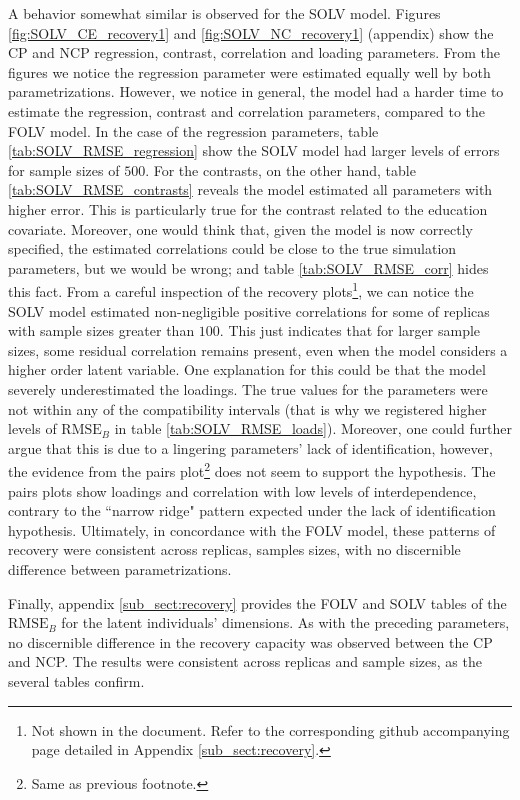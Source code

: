 A behavior somewhat similar is observed for the SOLV model. Figures \ref{fig:SOLV_CE_recovery1} and \ref{fig:SOLV_NC_recovery1} (appendix) show the CP and NCP regression, contrast, correlation and loading parameters. From the figures we notice the regression parameter were estimated equally well by both parametrizations. However, we notice in general, the model had a harder time to estimate the regression, contrast and correlation parameters, compared to the FOLV model. In the case of the regression parameters, table \ref{tab:SOLV_RMSE_regression} show the SOLV model had larger levels of errors for sample sizes of $500$. For the contrasts, on the other hand, table \ref{tab:SOLV_RMSE_contrasts} reveals the model estimated all parameters with higher error. This is particularly true for the contrast related to the education covariate. Moreover, one would think that, given the model is now correctly specified, the estimated correlations could be close to the true simulation parameters, but we would be wrong; and table \ref{tab:SOLV_RMSE_corr} hides this fact. From a careful inspection of the recovery plots\footnote{Not shown in the document. Refer to the corresponding github accompanying page detailed in Appendix \ref{sub_sect:recovery}.}, we can notice the SOLV model estimated non-negligible positive correlations for some of replicas with sample sizes greater than $100$. This just indicates that for larger sample sizes, some residual correlation remains present, even when the model considers a higher order latent variable. One explanation for this could be that the model severely underestimated the loadings. The true values for the parameters were not within any of the compatibility intervals (that is why we registered higher levels of $\text{RMSE}_{B}$ in table \ref{tab:SOLV_RMSE_loads}). Moreover, one could further argue that this is due to a lingering parameters' lack of identification, however, the evidence from the pairs plot\footnote{Same as previous footnote.} does not seem to support the hypothesis. The pairs plots show loadings and correlation with low levels of interdependence, contrary to the ``narrow ridge" pattern expected under the lack of identification hypothesis. Ultimately, in concordance with the FOLV model, these patterns of recovery were consistent across replicas, samples sizes, with no discernible difference between parametrizations.

Finally, appendix \ref{sub_sect:recovery} provides the FOLV and SOLV tables of the $\text{RMSE}_{B}$ for the latent individuals' dimensions. As with the preceding parameters, no discernible difference in the recovery capacity was observed between the CP and NCP. The results were consistent across replicas and sample sizes, as the several tables confirm. 

